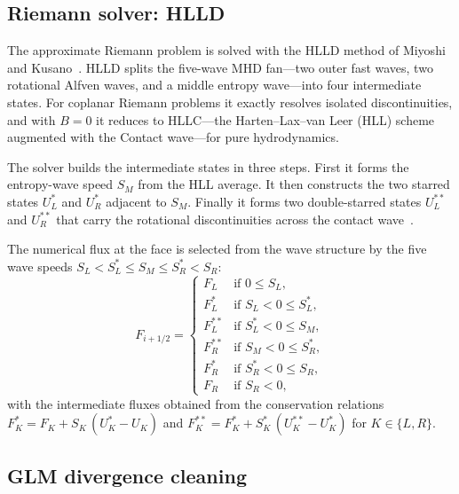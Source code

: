 \documentclass[11pt]{article}
\begin{document}
\subsection{Riemann solver: HLLD}

The approximate Riemann problem is solved with the HLLD method of Miyoshi and Kusano~\cite{miyoshi2005}.  HLLD splits the five-wave MHD fan---two outer fast waves, two rotational Alfven waves, and a middle entropy wave---into four intermediate states.  For coplanar Riemann problems it exactly resolves isolated discontinuities, and with $B = 0$ it reduces to HLLC---the Harten--Lax--van Leer (HLL) scheme augmented with the Contact wave---for pure hydrodynamics.

The solver builds the intermediate states in three steps.  First it forms the entropy-wave speed $S_M$ from the HLL average.  It then constructs the two starred states $U^{*}_{L}$ and $U^{*}_{R}$ adjacent to $S_M$.  Finally it forms two double-starred states $U^{**}_{L}$ and $U^{**}_{R}$ that carry the rotational discontinuities across the contact wave~\cite{miyoshi2005}.

The numerical flux at the face is selected from the wave structure by the five wave speeds $S_L < S^{*}_{L} \le S_M \le S^{*}_{R} < S_R$:
\begin{equation}
F_{i+1/2} = \begin{cases}
F_L           & \text{if } 0 \le S_L, \\
F^{*}_{L}     & \text{if } S_L < 0 \le S^{*}_{L}, \\
F^{**}_{L}    & \text{if } S^{*}_{L} < 0 \le S_M, \\
F^{**}_{R}    & \text{if } S_M < 0 \le S^{*}_{R}, \\
F^{*}_{R}     & \text{if } S^{*}_{R} < 0 \le S_R, \\
F_R           & \text{if } S_R < 0,
\end{cases}
\label{eq:hlld-select}
\end{equation}
with the intermediate fluxes obtained from the conservation relations $F^{*}_{K} = F_{K} + S_K\,(U^{*}_{K} - U_{K})$ and $F^{**}_{K} = F^{*}_{K} + S^{*}_{K}\,(U^{**}_{K} - U^{*}_{K})$ for $K \in \{L,R\}$.

\subsection{GLM divergence cleaning}
\end{document}
